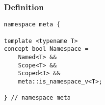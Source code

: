 
\subsubsection{Definition}

\begin{verbatim}
namespace meta {

template <typename T>
concept bool Namespace =
	Named<T> &&
	Scope<T> &&
	Scoped<T> &&
	meta::is_namespace_v<T>;

} // namespace meta
\end{verbatim}

